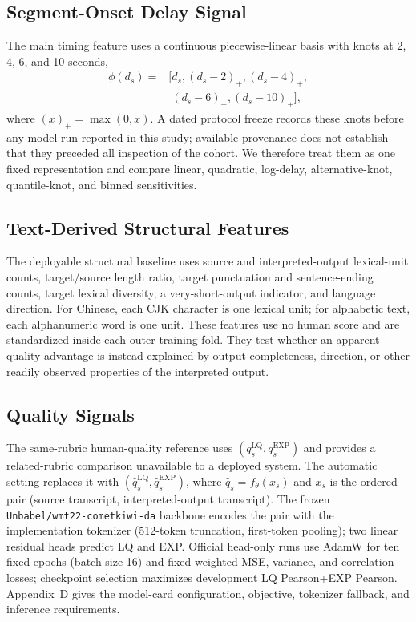 \subsection{Segment-Onset Delay Signal}
The main timing feature uses a continuous piecewise-linear basis with knots at 2, 4, 6, and 10 seconds,
\begin{equation}
\begin{aligned}
\phi(d_s)={}&[d_s, (d_s-2)_+, (d_s-4)_+,\\
             &\phantom{[}(d_s-6)_+, (d_s-10)_+],
\end{aligned}
\end{equation}
where $(x)_+=\max(0,x)$. A dated protocol freeze records these knots before any model run reported in this study; available provenance does not establish that they preceded all inspection of the cohort. We therefore treat them as one fixed representation and compare linear, quadratic, log-delay, alternative-knot, quantile-knot, and binned sensitivities.

\subsection{Text-Derived Structural Features}
The deployable structural baseline uses source and interpreted-output lexical-unit counts, target/source length ratio, target punctuation and sentence-ending counts, target lexical diversity, a very-short-output indicator, and language direction. For Chinese, each CJK character is one lexical unit; for alphabetic text, each alphanumeric word is one unit. These features use no human score and are standardized inside each outer training fold. They test whether an apparent quality advantage is instead explained by output completeness, direction, or other readily observed properties of the interpreted output.

\subsection{Quality Signals}
The same-rubric human-quality reference uses $(q_s^{\mathrm{LQ}},q_s^{\mathrm{EXP}})$ and provides a related-rubric comparison unavailable to a deployed system. The automatic setting replaces it with $(\hat q_s^{\mathrm{LQ}},\hat q_s^{\mathrm{EXP}})$, where $\hat q_s=f_\theta(x_s)$ and $x_s$ is the ordered pair (source transcript, interpreted-output transcript). The frozen \texttt{Unbabel/wmt22-cometkiwi-da} backbone encodes the pair with the implementation tokenizer (512-token truncation, first-token pooling); two linear residual heads predict LQ and EXP. Official head-only runs use AdamW for ten fixed epochs (batch size 16) and fixed weighted MSE, variance, and correlation losses; checkpoint selection maximizes development LQ Pearson+EXP Pearson. Appendix~D gives the model-card configuration, objective, tokenizer fallback, and inference requirements.

